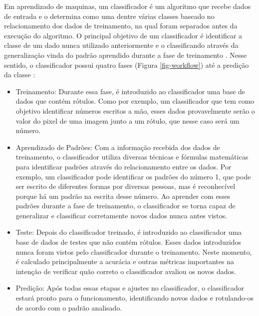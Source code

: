 Em aprendizado de maquinas, um classificador é um algoritmo que recebe dados de entrada e o determina como uma dentre várias classes baseado no relacionamento dos dados de treinamento, na qual foram separados antes da execução do algoritmo. O principal objetivo de um classificador é identificar a classe de um dado nunca utilizado anteriormente e o classificando através da generalização vinda do padrão aprendido durante a fase de treinamento \cite{pereira2009machine}.
Nesse sentido, o classificador possui quatro fases (Figura \ref{fig-workflow}) até a predição da classe \cite{mohammed2016machine}:

\begin{itemize}
  \item Treinamento: Durante essa fase, é introduzido ao classificador uma base de dados que contém rótulos. Como por exemplo, um classificador que tem como objetivo identificar números escritos a mão, esses dados provavelmente serão o valor do pixel de uma imagem junto a um rótulo, que nesse caso será um número.
  \item Aprendizado de Padrões: Com a informação recebida dos dados de treinamento, o classificador utiliza diversas técnicas e fórmulas matemáticas para identificar padrões através do relacionamento entre os dados. Por exemplo, um classificador pode identificar os padrões do número 1, que pode ser escrito de diferentes formas por diversas pessoas, mas é reconhecível porque há um padrão na escrita desse número. Ao aprender com esses padrões durante a fase de treinamento, o classificador se torna capaz de generalizar e classificar corretamente novos dados nunca antes vistos.
  \item Teste: Depois do classificador treinado, é introduzido ao classificador uma base de dados de testes que não contém rótulos. Esses dados introduzidos nunca foram vistos pelo classificador durante o treinamento. Neste momento, é calculado principalmente a acurácia e outras métricas importantes na intenção de verificar quão correto o classificador avaliou os novos dados.
  \item Predição: Após todas essas etapas e ajustes no classificador, o classificador estará pronto para o funcionamento, identificando novos dados e rotulando-os de acordo com o padrão analisado.
\end{itemize}


